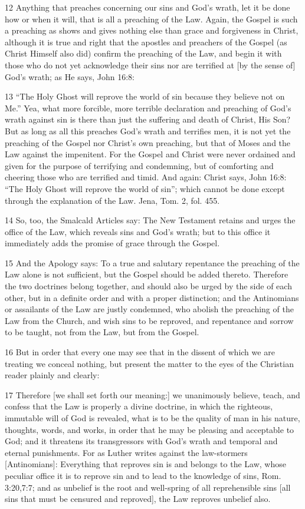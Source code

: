 12 Anything that preaches concerning our sins and God’s wrath, let it be done how or when it will, that is all a preaching of the Law. Again, the Gospel is such a preaching as shows and gives nothing else than grace and forgiveness in Christ, although it is true and right that the apostles and preachers of the Gospel (as Christ Himself also did) confirm the preaching of the Law, and begin it with those who do not yet acknowledge their sins nor are terrified at [by the sense of] God’s wrath; as He says, John 16:8:

13 “The Holy Ghost will reprove the world of sin because they believe not on Me.” Yea, what more forcible, more terrible declaration and preaching of God’s wrath against sin is there than just the suffering and death of Christ, His Son? But as long as all this preaches God’s wrath and terrifies men, it is not yet the preaching of the Gospel nor Christ’s own preaching, but that of Moses and the Law against the impenitent. For the Gospel and Christ were never ordained and given for the purpose of terrifying and condemning, but of comforting and cheering those who are terrified and timid. And again: Christ says, John 16:8: “The Holy Ghost will reprove the world of sin”; which cannot be done except through the explanation of the Law. Jena, Tom. 2, fol. 455.

14 So, too, the Smalcald Articles say: The New Testament retains and urges the office of the Law, which reveals sins and God’s wrath; but to this office it immediately adds the promise of grace through the Gospel.

15 And the Apology says: To a true and salutary repentance the preaching of the Law alone is not sufficient, but the Gospel should be added thereto. Therefore the two doctrines belong together, and should also be urged by the side of each other, but in a definite order and with a proper distinction; and the Antinomians or assailants of the Law are justly condemned, who abolish the preaching of the Law from the Church, and wish sins to be reproved, and repentance and sorrow to be taught, not from the Law, but from the Gospel.

16 But in order that every one may see that in the dissent of which we are treating we conceal nothing, but present the matter to the eyes of the Christian reader plainly and clearly:

17 Therefore [we shall set forth our meaning:] we unanimously believe, teach, and confess that the Law is properly a divine doctrine, in which the righteous, immutable will of God is revealed, what is to be the quality of man in his nature, thoughts, words, and works, in order that he may be pleasing and acceptable to God; and it threatens its transgressors with God’s wrath and temporal and eternal punishments. For as Luther writes against the law-stormers [Antinomians]: Everything that reproves sin is and belongs to the Law, whose peculiar office it is to reprove sin and to lead to the knowledge of sins, Rom. 3:20,7:7; and as unbelief is the root and well-spring of all reprehensible sins [all sins that must be censured and reproved], the Law reproves unbelief also.

